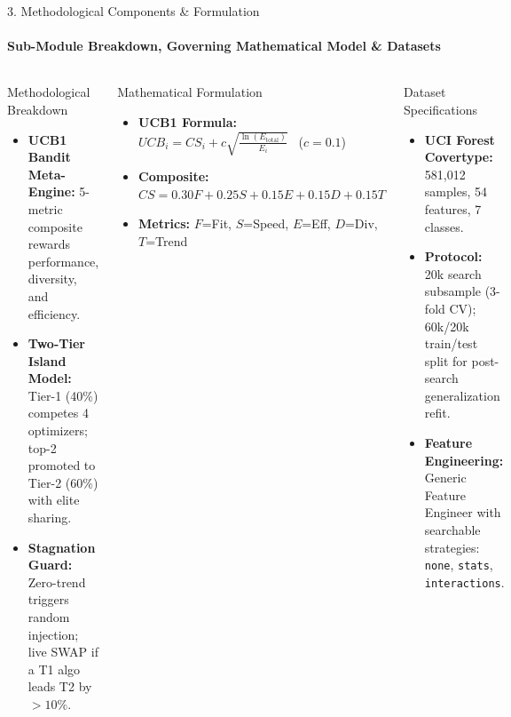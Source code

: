 \documentclass[aspectratio=169, 11pt]{beamer}
\begin{document}
\begin{frame}{3. Methodological Components \& Formulation}
    \framesubtitle{Sub-Module Breakdown, Governing Mathematical Model \& Datasets}
    \begin{columns}[T]
        \begin{block}{Methodological Breakdown}
            \scriptsize
            \begin{itemize}
                \setlength{\itemsep}{1pt}
                \item \textbf{UCB1 Bandit Meta-Engine:} 5-metric composite rewards performance, diversity, and efficiency.
                \item \textbf{Two-Tier Island Model:} Tier-1 (40\%) competes 4 optimizers; top-2 promoted to Tier-2 (60\%) with elite sharing.
                \item \textbf{Stagnation Guard:} Zero-trend triggers random injection; live SWAP if a T1 algo leads T2 by $>10\%$.
            \end{itemize}
        \end{block}

        \begin{block}{Mathematical Formulation}
            \scriptsize
            \begin{itemize}
                \setlength{\itemsep}{1pt}
                \item \textbf{UCB1 Formula:} $UCB_i = CS_i + c\sqrt{\frac{\ln(E_{\text{total}})}{E_i}}$ \ ($c=0.1$)
                \item \textbf{Composite:} $CS = 0.30F + 0.25S + 0.15E + 0.15D + 0.15T$
                \item \textbf{Metrics:} $F$=Fit, $S$=Speed, $E$=Eff, $D$=Div, $T$=Trend
            \end{itemize}
        \end{block}

        \begin{block}{Dataset Specifications}
            \scriptsize
            \begin{itemize}
                \setlength{\itemsep}{1pt}
                \item \textbf{UCI Forest Covertype:} 581,012 samples, 54 features, 7 classes.
                \item \textbf{Protocol:} 20k search subsample (3-fold CV); 60k/20k train/test split for post-search generalization refit.
                \item \textbf{Feature Engineering:} Generic Feature Engineer with searchable strategies: \texttt{none}, \texttt{stats}, \texttt{interactions}.
            \end{itemize}
        \end{block}


\end{columns}
\end{frame}
\end{document}

